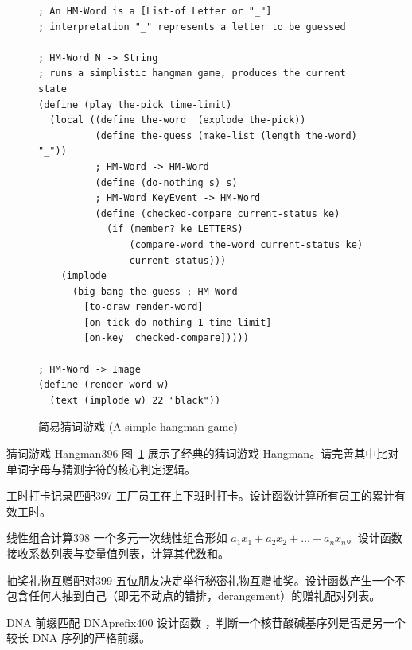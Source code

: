 \begin{figure}[htbp]
  \centering
\begin{lstlisting}[language=BSL, basicstyle=\scriptsize\ttfamily]
; An HM-Word is a [List-of Letter or "_"]
; interpretation "_" represents a letter to be guessed

; HM-Word N -> String
; runs a simplistic hangman game, produces the current state
(define (play the-pick time-limit)
  (local ((define the-word  (explode the-pick))
          (define the-guess (make-list (length the-word) "_"))
          ; HM-Word -> HM-Word
          (define (do-nothing s) s)
          ; HM-Word KeyEvent -> HM-Word
          (define (checked-compare current-status ke)
            (if (member? ke LETTERS)
                (compare-word the-word current-status ke)
                current-status)))
    (implode
      (big-bang the-guess ; HM-Word
        [to-draw render-word]
        [on-tick do-nothing 1 time-limit]
        [on-key  checked-compare]))))

; HM-Word -> Image
(define (render-word w)
  (text (implode w) 22 "black"))
\end{lstlisting}
  \caption{简易猜词游戏 (A simple hangman game)}
  \label{fig:136}
\end{figure}

\begin{exercise}{猜词游戏 Hangman}{396}
图~\ref{fig:136} 展示了经典的猜词游戏 Hangman。请完善其中比对单词字母与猜测字符的核心判定逻辑。
\end{exercise}

\begin{exercise}{工时打卡记录匹配}{397}
工厂员工在上下班时打卡。设计函数计算所有员工的累计有效工时。
\end{exercise}

\begin{exercise}{线性组合计算}{398}
一个多元一次线性组合形如 $a_1 x_1 + a_2 x_2 + \dots + a_n x_n$。设计函数接收系数列表与变量值列表，计算其代数和。
\end{exercise}

\begin{exercise}{抽奖礼物互赠配对}{399}
五位朋友决定举行秘密礼物互赠抽奖。设计函数产生一个不包含任何人抽到自己（即无不动点的错排，derangement）的赠礼配对列表。
\end{exercise}

\begin{exercise}{DNA 前缀匹配 DNAprefix}{400}
设计函数 ，判断一个核苷酸碱基序列是否是另一个较长 DNA 序列的严格前缀。
\end{exercise}

